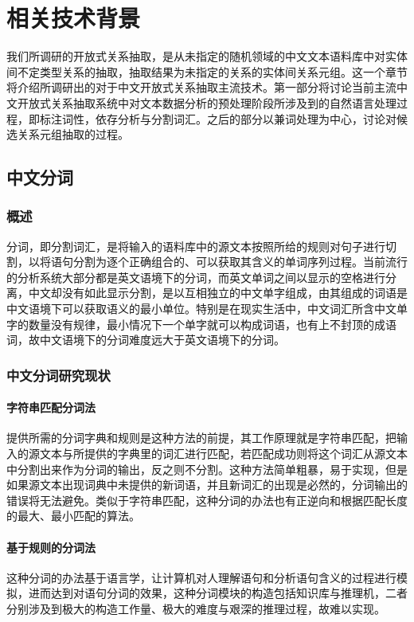 \chapter{相关技术背景}
我们所调研的开放式关系抽取，是从未指定的随机领域的中文文本语料库中对实体间不定类型关系的抽取，抽取结果为未指定的关系的实体间关系元组。这一个章节将介绍所调研出的对于中文开放式关系抽取主流技术。第一部分将讨论当前主流中文开放式关系抽取系统中对文本数据分析的预处理阶段所涉及到的自然语言处理过程，即标注词性，依存分析与分割词汇。之后的部分以兼词处理为中心，讨论对候选关系元组抽取的过程\citep{liyang2016}。

\section{中文分词}
\subsection{概述}
分词，即分割词汇，是将输入的语料库中的源文本按照所给的规则对句子进行切割，以将语句分割为逐个正确组合的、可以获取其含义的单词序列过程。当前流行的分析系统大部分都是英文语境下的分词，而英文单词之间以显示的空格进行分离，中文却没有如此显示分割，是以互相独立的中文单字组成，由其组成的词语是中文语境下可以获取语义的最小单位。特别是在现实生活中，中文词汇所含中文单字的数量没有规律，最小情况下一个单字就可以构成词语，也有上不封顶的成语词，故中文语境下的分词难度远大于英文语境下的分词。

\subsection{中文分词研究现状}
\subsubsection{字符串匹配分词法}
提供所需的分词字典和规则是这种方法的前提，其工作原理就是字符串匹配，把输入的源文本与所提供的字典里的词汇进行匹配，若匹配成功则将这个词汇从源文本中分割出来作为分词的输出，反之则不分割。这种方法简单粗暴，易于实现，但是如果源文本出现词典中未提供的新词语，并且新词汇的出现是必然的，分词输出的错误将无法避免。类似于字符串匹配，这种分词的办法也有正逆向和根据匹配长度的最大、最小匹配的算法。

\subsubsection{基于规则的分词法}
这种分词的办法基于语言学，让计算机对人理解语句和分析语句含义的过程进行模拟，进而达到对语句分词的效果，这种分词模块的构造包括知识库与推理机，二者分别涉及到极大的构造工作量、极大的难度与艰深的推理过程，故难以实现。

